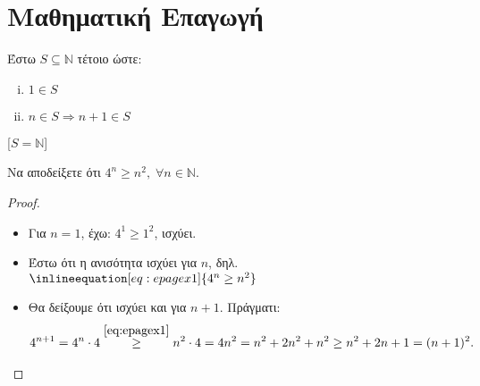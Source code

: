 \documentclass[main.tex]{subfiles}
\begin{document}
\section{Μαθηματική Επαγωγή}

\begin{thm}
    Έστω $ S \subseteq \mathbb{N} $ τέτοιο ώστε:
\begin{minipage}[t]{0.25\textwidth}
    \begin{enumerate}[i)]
        \item  $ 1 \in S $ \hfill {}
        \item  $ n \in S \Rightarrow n + 1 \in S $ \hfill {}
    \end{enumerate} 
\end{minipage}
[$ S = \mathbb{N} $]

\end{thm}

\begin{example}
    Να αποδείξετε ότι $ 4^{n} \geq n^{2}, \; \forall n \in \mathbb{N} $.
    \begin{proof}
    \item {}
        \begin{itemize}
            \item Για $ n=1 $, έχω: $ 4^{1} \geq 1^{2} $, ισχύει.
            \item Έστω ότι η ανισότητα ισχύει για $n$, δηλ. 
                $\inlineequation[eq:epagex1]{4^{n} \geq n^{2}}$
            \item Θα δείξουμε ότι ισχύει και για $ n+1 $. Πράγματι:
                \begin{align*}
                4^{n+1} = 4^{n}\cdot 4 \overset{\eqref{eq:epagex1}}{\geq} n^{2}\cdot 4 
                = 4n^{2} = n^{2} + 2n^{2} + n^{2} \geq n^{2} + 2n + 1 = (n+1)^{2}.
                \end{align*}
        \end{itemize}
    \end{proof}
\end{example}
\end{document}
